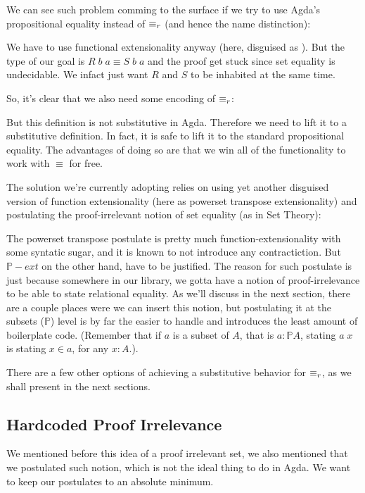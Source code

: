 We can see such problem comming to the surface if we try to use Agda's propositional equality 
instead of $\equiv_r$ (and hence the name distinction):


We have to use functional extensionality anyway (here, disguised as ). But the 
type of our goal is $R\;b\;a \equiv S\;b\;a$ and the proof get stuck since set equality is
undecidable. We infact just want $R$ and $S$ to be inhabited at
the same time.

So, it's clear that we also need some encoding of $\equiv_r$:


But this definition is not substitutive in Agda. Therefore we need to lift it to
a substitutive definition. In fact, it is safe to lift it to the standard propositional equality.
The advantages of doing so are that we win all of the functionality to work with $\equiv$ for free.

The solution we're currently adopting relies on using yet another disguised version of
function extensionality (here as powerset transpose extensionality) 
and postulating the proof-irrelevant notion of set equality (as in Set Theory):


The powerset transpose postulate is pretty much function-extensionality with some syntatic sugar, and it is
known to not introduce any contractiction. But $ℙ-ext$ on the other hand, have to be justified.
The reason for such postulate is just because somewhere in our library, we gotta have a notion
of proof-irrelevance to be able to state relational equality. As we'll discuss in the next section,
there are a couple places were we can insert this notion, but postulating it at the subsets ($ℙ$) level is
by far the easier to handle and introduces the least amount of boilerplate code. (Remember that
if $a$ is a subset of $A$, that is $a : ℙ A$, stating $a\;x$ is stating $x \in a$, for any $x : A$.).

There are a few other options of achieving a substitutive behavior for $\equiv_r$,  
as we shall present in the next sections.

\subsection{Hardcoded Proof Irrelevance}

  We mentioned before this idea of a proof irrelevant set, we also mentioned that we postulated
  such notion, which is not the ideal thing to do in Agda. We want to keep our postulates to an
  absolute minimum.
  
